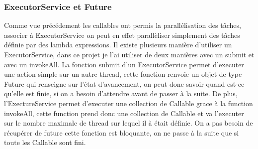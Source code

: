 \subsubsection{ExecutorService et Future}

Comme vue précédement les callables ont permis la parallélisation des tâches, associer à ExecutorService on peut en effet parallèliser simplement des tâches définie par des lambda expressions.
\ml
Il existe plusieurs manière d'utiliser un ExecutorService, dans ce projet je l'ai utiliser de deux manières avec un submit et avec un invokeAll.
\ml
La fonction submit d'un ExecutorService permet d'executer une action simple sur un autre thread, cette fonction renvoie un objet de type Future qui renseigne sur l'état d'avancement, on peut donc savoir quand est-ce qu'elle est finie, si on a besoin d'attendre avant de passer à la suite.
\ml
De plus, l'ExectureService permet d'executer une collection de Callable grace à la function invokeAll, cette function prend donc une collection de Callable et va l'executer sur le nombre maximale de thread sur lequel il à était définie. On a pas besoin de récupérer de future cette fonction est bloquante, on ne passe à la suite que si toute les Callable sont fini.
